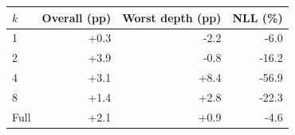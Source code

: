 \begin{tabular}{lrrr}
\toprule
$k$ & Overall (pp) & Worst depth (pp) & NLL (\%) \\
\midrule
1 & +0.3 & -2.2 & -6.0 \\
2 & +3.9 & -0.8 & -16.2 \\
4 & +3.1 & +8.4 & -56.9 \\
8 & +1.4 & +2.8 & -22.3 \\
Full & +2.1 & +0.9 & -4.6 \\
\bottomrule
\end{tabular}
